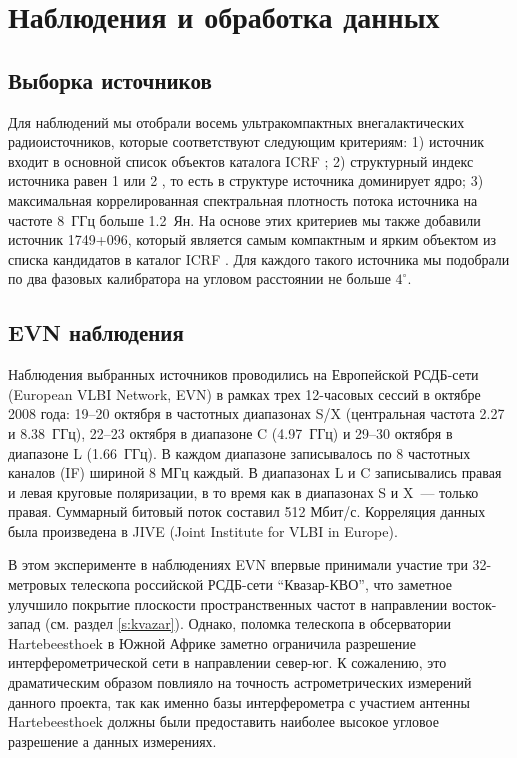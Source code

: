 \section{Наблюдения и обработка данных}

\subsection{Выборка источников}
Для наблюдений мы отобрали восемь ультракомпактных внегалактических радиоисточников, которые
соответствуют следующим критериям: 1) источник входит в основной список объектов каталога ICRF
\cite{Ma_1998}; 2) структурный индекс источника равен 1 или 2 \cite{Ma_1998}, то есть в структуре
источника доминирует ядро; 3) максимальная коррелированная спектральная плотность потока источника
на частоте 8~ГГц больше 1.2~Ян. На основе этих критериев мы также добавили источник 1749+096,
который является самым компактным и ярким объектом из списка кандидатов в каталог ICRF
\cite{Ma_1998}. Для каждого такого источника мы подобрали по два фазовых калибратора на угловом
расстоянии не больше $4^\circ$.

\subsection{EVN наблюдения}
Наблюдения выбранных источников проводились на Европейской РСДБ-сети (European VLBI Network, EVN) в
рамках трех 12-часовых сессий в октябре 2008 года: 19--20 октября в частотных диапазонах S/X
(центральная частота 2.27 и 8.38~ГГц), 22--23 октября в диапазоне C (4.97~ГГц) и 29--30 октября в
диапазоне L (1.66~ГГц).
В каждом диапазоне записывалось по 8 частотных каналов (IF) шириной 8 МГц каждый. В диапазонах L и C
записывались правая и левая круговые поляризации, в то время как в диапазонах S и X~--- только
правая. Суммарный битовый поток составил 512 Мбит/с. Корреляция данных была произведена в
JIVE (Joint Institute for VLBI in Europe).

В этом эксперименте в наблюдениях EVN впервые принимали участие три 32-метровых телескопа российской
РСДБ-сети ``Квазар-КВО'', что заметное улучшило покрытие плоскости пространственных частот в
направлении восток-запад (см. раздел \ref{s:kvazar}). Однако, поломка телескопа в обсерватории
Hartebeesthoek в Южной Африке заметно ограничила разрешение интерферометрической сети в направлении
север-юг. К сожалению, это драматическим образом повлияло на точность астрометрических измерений
данного проекта, так как именно базы интерферометра с участием  антенны Hartebeesthoek должны были
предоставить наиболее высокое угловое разрешение а данных измерениях.

